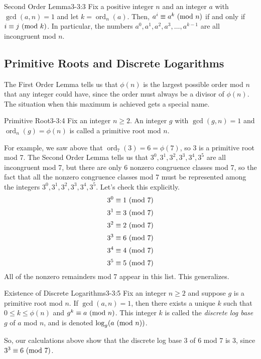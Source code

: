\documentclass[letterpaper]{article}
\DeclareMathOperator{\ord}{ord}
\begin{document}
\begin{lemma}{Second Order Lemma}{3-3:3}
    Fix a positive integer $n$ and an integer $a$ with $\gcd(a, n) = 1$ and let $k = \ord_{n}(a)$. Then, $a^i \equiv a^k \ (\mathrm{mod}\ n)$ if and only if $i \equiv j \ (\mathrm{mod}\ k)$. In particular, the numbers $a^0, a^1, a^2, a^3, \hdots, a^{k - 1}$ are all incongruent mod $n$. 
\end{lemma}

\subsection{Primitive Roots and Discrete Logarithms}
The First Order Lemma tells us that $\phi(n)$ is the largest possible order mod $n$ that any integer could have, since the order must always be a divisor of $\phi(n)$. The situation when this maximum is achieved gets a special name.

\begin{definition}{Primitive Root}{3-3:4}
    Fix an integer $n \geq 2$. An integer $g$ with $\gcd(g, n) = 1$ and $\ord_{n}(g) = \phi(n)$ is called a primitive root mod $n$. 
\end{definition}
For example, we saw above that $\ord_{7}(3) = 6 = \phi(7)$, so 3 is a primitive root mod 7. The Second Order Lemma tells us that $3^0, 3^1, 3^2, 3^3, 3^4, 3^5$ are all incongruent mod 7, but there are only 6 nonzero congruence classes mod 7, so the fact that all the nonzero congruence classes mod 7 must be represented among the integers $3^0, 3^1, 3^2, 3^3, 3^4, 3^5$. Let's check this explicitly. 
\[3^0 \equiv 1 \ (\mathrm{mod}\ 7)\]
\[3^1 \equiv 3 \ (\mathrm{mod}\ 7)\]
\[3^2 \equiv 2 \ (\mathrm{mod}\ 7)\]
\[3^3 \equiv 6 \ (\mathrm{mod}\ 7)\]
\[3^4 \equiv 4 \ (\mathrm{mod}\ 7)\]
\[3^5 \equiv 5 \ (\mathrm{mod}\ 7)\]
All of the nonzero remainders mod 7 appear in this list. This generalizes. 
\begin{lemma}{Existence of Discrete Logarithms}{3-3:5}
    Fix an integer $n \geq 2$ and suppose $g$ is a primitive root mod $n$. If $\gcd(a, n) = 1$, then there exists a unique $k$ such that $0 \leq k \leq \phi(n)$ and $g^k \equiv a \ (\mathrm{mod}\ n)$. This integer $k$ is called the \emph{discrete log base} $g$ of $a$ mod $n$, and is denoted $\log_{g}(a \ (\mathrm{mod}\ n))$.
\end{lemma}
So, our calculations above show that the discrete log base 3 of 6 mod 7 is 3, since $3^3 \equiv 6 \ (\mathrm{mod}\ 7)$. 
\end{document}
